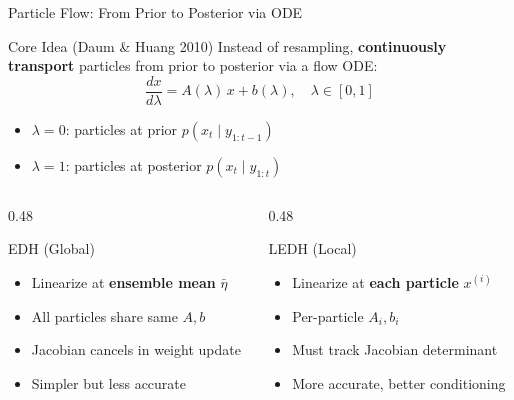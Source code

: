 \documentclass[aspectratio=169,10pt]{beamer}
\newcommand{\highlight}[1]{\textcolor{jpmlightblue}{\textbf{#1}}}
\begin{document}
\begin{frame}{Particle Flow: From Prior to Posterior via ODE}
\begin{block}{Core Idea (Daum \& Huang 2010)}
Instead of resampling, \highlight{continuously transport} particles from prior to posterior via a flow ODE:
\[
  \frac{dx}{d\lambda} = A(\lambda)\,x + b(\lambda), \quad \lambda \in [0, 1]
\]
\vspace{-0.5em}
\begin{itemize}
  \item $\lambda = 0$: particles at prior $p(x_t \mid y_{1:t-1})$
  \item $\lambda = 1$: particles at posterior $p(x_t \mid y_{1:t})$
\end{itemize}
\end{block}

\begin{columns}[T]
\begin{column}{0.48\textwidth}
\begin{exampleblock}{EDH (Global)}
\begin{itemize}
  \item Linearize at \highlight{ensemble mean} $\bar{\eta}$
  \item All particles share same $A, b$
  \item Jacobian cancels in weight update
  \item Simpler but less accurate
\end{itemize}
\end{exampleblock}
\end{column}
\begin{column}{0.48\textwidth}
\begin{exampleblock}{LEDH (Local)}
\begin{itemize}
  \item Linearize at \highlight{each particle} $x^{(i)}$
  \item Per-particle $A_i, b_i$
  \item Must track Jacobian determinant
  \item More accurate, better conditioning
\end{itemize}
\end{exampleblock}
\end{column}
\end{columns}
\end{frame}
\end{document}
